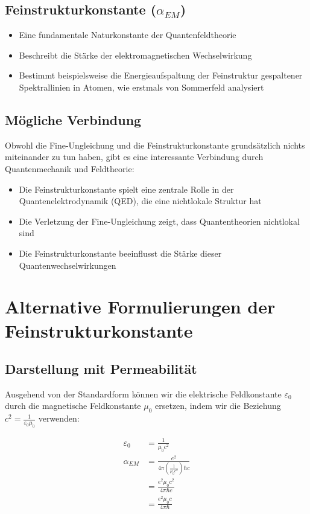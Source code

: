 \documentclass[12pt,a4paper]{article}
\begin{document}
	\subsection{Feinstrukturkonstante ($\alpha_{EM}$)}
	\begin{itemize}
		\item Eine fundamentale Naturkonstante der Quantenfeldtheorie \cite{Weinberg1995}
		\item Beschreibt die Stärke der elektromagnetischen Wechselwirkung
		\item Bestimmt beispielsweise die Energieaufspaltung der Feinstruktur gespaltener Spektrallinien in Atomen, wie erstmals von Sommerfeld analysiert \cite{Sommerfeld1916}
	\end{itemize}
	
	\subsection{Mögliche Verbindung}
	Obwohl die Fine-Ungleichung und die Feinstrukturkonstante grundsätzlich nichts miteinander zu tun haben, gibt es eine interessante Verbindung durch Quantenmechanik und Feldtheorie:
	
	\begin{itemize}
		\item Die Feinstrukturkonstante spielt eine zentrale Rolle in der Quantenelektrodynamik (QED), die eine nichtlokale Struktur hat
		\item Die Verletzung der Fine-Ungleichung zeigt, dass Quantentheorien nichtlokal sind
		\item Die Feinstrukturkonstante beeinflusst die Stärke dieser Quantenwechselwirkungen
	\end{itemize}
	
	\section{Alternative Formulierungen der Feinstrukturkonstante}
	
	\subsection{Darstellung mit Permeabilität}
	Ausgehend von der Standardform \cite{Griffiths2017} können wir die elektrische Feldkonstante $\varepsilon_0$ durch die magnetische Feldkonstante $\mu_0$ ersetzen, indem wir die Beziehung $c^2 = \frac{1}{\varepsilon_0\mu_0}$ verwenden:
	
	\begin{align}
		\varepsilon_0 &= \frac{1}{\mu_0c^2}\\
		\alpha_{EM} &= \frac{e^2}{4\pi\left(\frac{1}{\mu_0c^2}\right)\hbar c}\\
		&= \frac{e^2\mu_0c^2}{4\pi\hbar c}\\
		&= \frac{e^2\mu_0c}{4\pi\hbar}
	\end{align}
	
\end{document}
